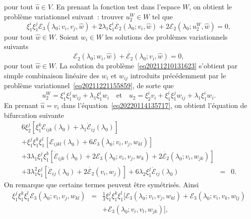 \documentclass[12pt, final]{amsart}
\begin{document}
pour tout $\hat{u} \in V$. En prenant la fonction test dans l'espace $W$, on
obtient le probl{\`e}me variationnel suivant~: trouver $u_2^W \in W$ tel que
\begin{equation}
  \label{eq20211210131623} \xi_1^i \xi_1^j \mathcal{E}_3 (\lambda_0 ; v_i,
  v_j, \hat{w}) + 2 \lambda_1 \xi_1^i  \dot{\mathcal{E}_2} (\lambda_0 ; v_i,
  \hat{w}) + 2\mathcal{E}_2 (\lambda_0 ; u_2^W, \hat{w}) = 0,
\end{equation}
pour tout $\hat{w} \in W$. Soient $w_i \in W$ les solutions des probl{\`e}mes
variationnels suivants
\begin{equation}
  \label{eq20220208143055} \mathcal{E}_2 (\lambda_0 ; w_i, \hat{w}) +
  \dot{\mathcal{E}_2} (\lambda_0 ; v_i, \hat{w}) = 0,
\end{equation}
pour tout $\hat{w} \in W$. La solution du
probl{\`e}me~\eqref{eq20211210131623} s'obtient par simple combinaison
linéaire des $w_i$ et $w_{ij}$ introduits précédemment par le
probl{\`e}me variationnel~\eqref{eq20211221155859}, de sorte que
\begin{equation}
  \label{eq20220124135324} u_2^W = \xi_1^i \xi_1^j w_{i  j} +
  \lambda_1 \xi_1^i w_i \quad \text{et} \quad u_2 = \xi_2^i v_i + \xi_1^i
  \xi_1^j w_{i  j} + \lambda_1 \xi_1^i w_i .
\end{equation}
En prenant $\hat{u} = v_i$ dans l'équation~\eqref{eq20220114135717}, on
obtient l'équation de bifurcation suivante
\begin{eqnarray}
  6 \xi_2^j  [\xi_1^k \mathcal{E}_{i  j  k} (\lambda_0) +
  \lambda_1  \dot{\mathcal{E}}_{i  j} (\lambda_0)] &  &  \nonumber\\
  + \xi_1^j \xi_1^k \xi_1^l  [\mathcal{E}_{i  j  k  l}
  (\lambda_0) + 6\mathcal{E}_3 (\lambda_0 ; v_i, v_j, w_{k  l})] &  &
  \nonumber\\
  + 3 \lambda_1 \xi_1^j \xi_1^k  [\dot{\mathcal{E}}_{i  j  k}
  (\lambda_0) + 2\mathcal{E}_3 (\lambda_0 ; v_i, v_j, w_k) + 2
  \dot{\mathcal{E}_2} (\lambda_0 ; v_i, w_{j  k})] &  &  \nonumber\\
  + 3 \lambda_1^2 \xi_1^j  [\ddot{\mathcal{E}}_{i  j} (\lambda_0) + 2
  \dot{\mathcal{E}_2} (v_i, w_j)] + 6 \lambda_2 \xi_1^j  \dot{\mathcal{E}}_{i
   j} (\lambda_0) & = & 0.  \label{eq20220210143805}
\end{eqnarray}
On remarque que certains termes peuvent {\^e}tre symétrisés. Ainsi
\begin{eqnarray}
  \xi_1^j \xi_1^k \xi_1^l \mathcal{E}_3 (\lambda_0 ; v_i, v_j, w_{k
  l}) & = & \tfrac{1}{3} \xi_1^j \xi_1^k \xi_1^l  [\mathcal{E}_3 (\lambda_0 ;
  v_i, v_j, w_{k  l})  +\mathcal{E}_3 (\lambda_0 ; v_i, v_k,
  w_{l  j}) \nonumber\\
  &  &   +\mathcal{E}_3 (\lambda_0 ; v_i, v_l, w_{j
   k})],
\end{eqnarray}
\end{document}

